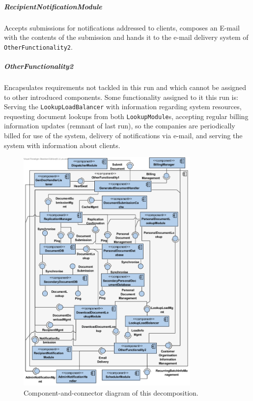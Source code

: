 \documentclass[a4paper,10pt]{article}
\begin{document}
\subparagraph{RecipientNotificationModule}
Accepts submissions for notifications addressed to clients, composes an E-mail with the contents of the submission and hands it to the e-mail delivery system of \texttt{OtherFunctionality2}.

\subparagraph{OtherFunctionality2}
Encapsulates requirements not tackled in this run and which cannot be assigned to other introduced components. Some functionality assigned to it this run is: Serving the \texttt{LookupLoadBalancer} with information regarding system resources, requesting document lookups from both \texttt{LookupModule}s, accepting regular billing information updates (remnant of last run), so the companies are periodically billed for use of the system, delivery of notifications via e-mail, and serving the system with information about clients.

\begin{figure}[!htp]
    \centering
    \includegraphics[width=0.8\textwidth]{comp_diag_2.png}
    \caption{Component-and-connector diagram of this decomposition.
        }\label{fig:it2-cc_main}
\end{figure}
\end{document}
